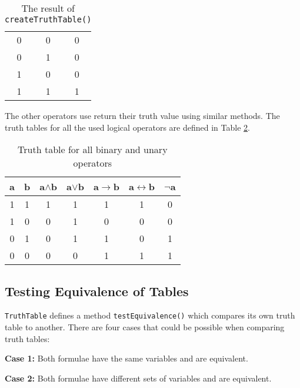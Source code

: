 \documentclass{report}
\begin{document}
\begin{table}[h]
  \begin{center}
    \begin{tabular}{ || c | c || c || }
      \hline
      0 & 0 & 0 \\
      0 & 1 & 0 \\
      1 & 0 & 0 \\
      1 & 1 & 1 \\
      \hline
    \end{tabular}
  \end{center}
  \caption{The result of {\tt createTruthTable()}}
  \label{table:final_generated_table}
\end{table}

The other operators use return their truth value using similar methods. The truth tables for all the used logical operators are defined in Table \ref{table:logical_operators}.

\begin{table}[h]
  \begin{center}
    \begin{tabular}{ || c | c || c | c | c | c | c || }
      \hline
      a & b & a$\land$b & a$\lor$b & a$\to$b & a$\leftrightarrow$b & $\lnot$a \\ \hline
      1 & 1 & 1 & 1 & 1 & 1 & 0 \\
      1 & 0 & 0 & 1 & 0 & 0 & 0 \\
      0 & 1 & 0 & 1 & 1 & 0 & 1 \\
      0 & 0 & 0 & 0 & 1 & 1 & 1 \\
      \hline
    \end{tabular}
  \end{center}
  \caption{Truth table for all binary and unary operators}
  \label{table:logical_operators}
\end{table}

\subsection{Testing Equivalence of Tables}

{\tt TruthTable} defines a method {\tt testEquivalence()} which compares its own truth table to another. There are four cases that could be possible when comparing truth tables:

\textbf{Case 1: } Both formulae have the same variables and are equivalent.

\textbf{Case 2: } Both formulae have different sets of variables and are equivalent.
\end{document}
